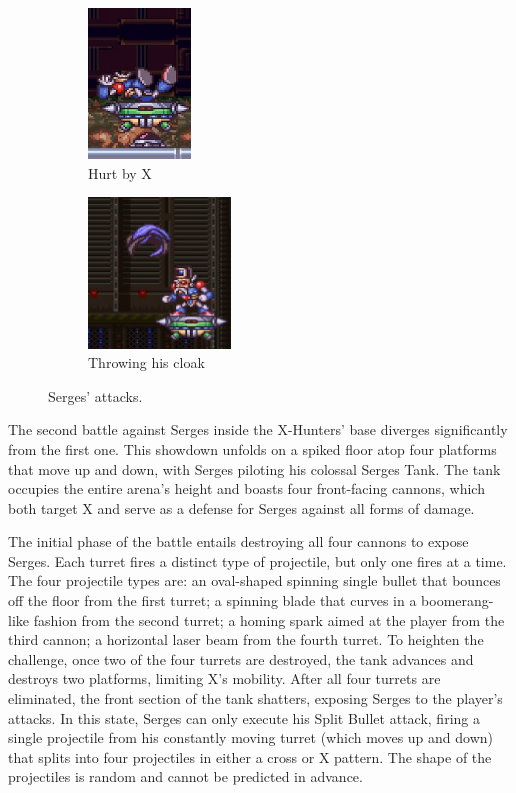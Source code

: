 \begin{figure}[htp]
	\centering
	\ContinuedFloat
	\begin{subfigure}{0.3\linewidth}
		\centering
		\includegraphics[height=4cm]{figures/X2/Hunter_stages/Serges_hurt.png}
		\caption{Hurt by X}
	\end{subfigure}
	\begin{subfigure}{0.3\linewidth}
		\centering
		\includegraphics[height=4cm]{figures/X2/Hunter_stages/Serges_cloak.jpg}
		\caption{Throwing his cloak}
	\end{subfigure}
	\caption{Serges' attacks.}	
\end{figure}

The second battle against Serges inside the X-Hunters' base diverges significantly from the first one. This showdown unfolds on a spiked floor atop four platforms that move up and down, with Serges piloting his colossal Serges Tank. The tank occupies the entire arena's height and boasts four front-facing cannons, which both target X and serve as a defense for Serges against all forms of damage.

The initial phase of the battle entails destroying all four cannons to expose Serges. Each turret fires a distinct type of projectile, but only one fires at a time. The four projectile types are: an oval-shaped spinning single bullet that bounces off the floor from the first turret; a spinning blade that curves in a boomerang-like fashion from the second turret; a homing spark aimed at the player from the third cannon; a horizontal laser beam from the fourth turret. To heighten the challenge, once two of the four turrets are destroyed, the tank advances and destroys two platforms, limiting X's mobility. After all four turrets are eliminated, the front section of the tank shatters, exposing Serges to the player's attacks. In this state, Serges can only execute his Split Bullet attack, firing a single projectile from his constantly moving turret (which moves up and down) that splits into four projectiles in either a cross or X pattern. The shape of the projectiles is random and cannot be predicted in advance.

